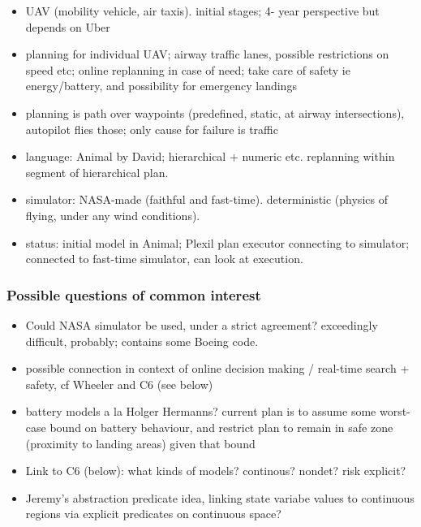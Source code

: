 \begin{itemize}

\item UAV (mobility vehicle, air taxis). initial stages; 4- year
  perspective but depends on Uber

\item planning for individual UAV; airway traffic lanes, possible
  restrictions on speed etc; online replanning in case of need; take
  care of safety ie energy/battery, and possibility for emergency
  landings

\item planning is path over waypoints (predefined, static, at airway
  intersections), autopilot flies those; only cause for failure is
  traffic

\item language: Animal by David; hierarchical + numeric
  etc. replanning within segment of hierarchical plan.

\item simulator: NASA-made (faithful and fast-time). deterministic
  (physics of flying, under any wind conditions).

\item status: initial model in Animal; Plexil plan executor connecting
  to simulator; connected to fast-time simulator, can look at
  execution.


\end{itemize}




\subsubsection{Possible questions of common interest}

\begin{itemize}

\item Could NASA simulator be used, under a strict agreement?
  exceedingly difficult, probably; contains some Boeing code.

\item possible connection in context of online decision making /
  real-time search + safety, cf Wheeler and C6 (see below)

\item battery models a la Holger Hermanns? current plan is to assume
  some worst-case bound on battery behaviour, and restrict plan to
  remain in safe zone (proximity to landing areas) given that bound

\item Link to C6 (below): what kinds of models? continous? nondet?
  risk explicit?

\item Jeremy's abstraction predicate idea, linking state variabe
  values to continuous regions via explicit predicates on continuous
  space?

\end{itemize}






